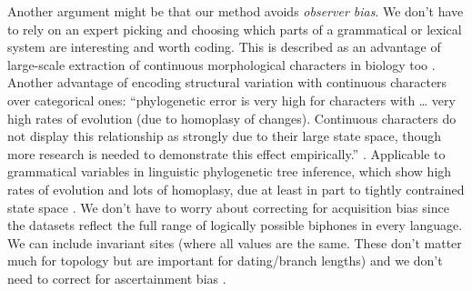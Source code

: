 \documentclass[]{article}
\begin{document}
Another argument might be that our method avoids \emph{observer bias}. We don't have to rely on an expert picking and choosing which parts of a grammatical or lexical system are interesting and worth coding. This is described as an advantage of large-scale extraction of continuous morphological characters in biology too \autocite{wright_systematists_2019}. Another advantage of encoding structural variation with continuous characters over categorical ones: ``phylogenetic error is very high for characters with \ldots{} very high rates of evolution (due to homoplasy of changes). Continuous characters do not display this relationship as strongly due to their large state space, though more research is needed to demonstrate this effect empirically.'' \autocite{wright_bayesian_2014}. Applicable to grammatical variables in linguistic phylogenetic tree inference, which show high rates of evolution and lots of homoplasy, due at least in part to tightly contrained state space \autocite{greenhill_evolutionary_2017}. We don't have to worry about correcting for acquisition bias since the datasets reflect the full range of logically possible biphones in every language. We can include invariant sites (where all values are the same. These don't matter much for topology but are important for dating/branch lengths) and we don't need to correct for ascertainment bias \autocite{leache_short_2015}.
\end{document}
